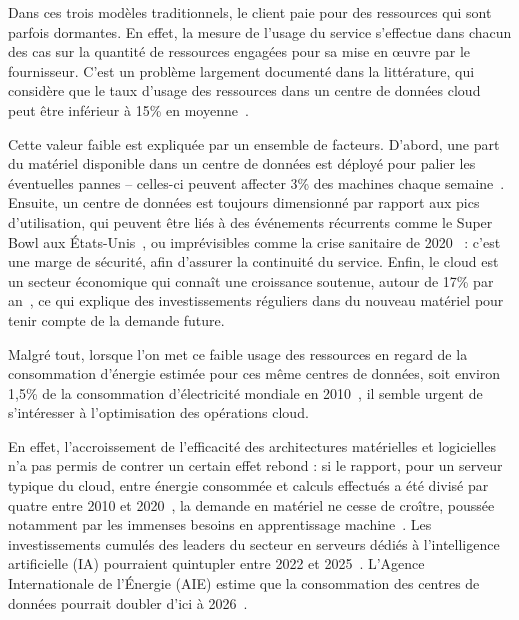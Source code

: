 Dans ces trois modèles traditionnels, le client paie pour des ressources qui sont parfois dormantes. En effet, la mesure de l'usage du service s'effectue dans chacun des cas sur la quantité de ressources engagées pour sa mise en œuvre par le fournisseur. C'est un problème largement documenté dans la littérature, qui considère que le taux d'usage des ressources dans un centre de données cloud peut être inférieur à 15\% en moyenne~\cite{vasanWorthTheirWatts2010, vermaLargescaleClusterManagement2015a}.

Cette valeur faible est expliquée par un ensemble de facteurs. D'abord, une part du matériel disponible dans un centre de données est déployé pour palier les éventuelles pannes -- celles-ci peuvent affecter 3\% des machines chaque semaine~\cite{BareMetal70B}. Ensuite, un centre de données est toujours dimensionné par rapport aux pics d'utilisation, qui peuvent être liés à des événements récurrents comme le Super Bowl aux États-Unis~\cite{wangTouchdownCloudImpact2019}, ou imprévisibles comme la crise sanitaire de 2020~\cite{alashhabImpactCoronavirusPandemic2021} : c'est une marge de sécurité, afin d'assurer la continuité du service. Enfin, le cloud est un secteur économique qui connaît une croissance soutenue, autour de 17\% par an~\cite{}, ce qui explique des investissements réguliers dans du nouveau matériel pour tenir compte de la demande future.

Malgré tout, lorsque l'on met ce faible usage des ressources en regard de la consommation d'énergie estimée pour ces même centres de données, soit environ 1,5\% de la consommation d'électricité mondiale en 2010~\cite{masanetRecalibratingGlobalData2020}, il semble urgent de s'intéresser à l'optimisation des opérations cloud.

En effet, l'accroissement de l'efficacité des architectures matérielles et logicielles n'a pas permis de contrer un certain effet rebond : si le rapport, pour un serveur typique du cloud, entre énergie consommée et calculs effectués a été divisé par quatre entre 2010 et 2020~\cite{masanetRecalibratingGlobalData2020}, la demande en matériel ne cesse de croître, poussée notamment par les immenses besoins en apprentissage machine~\cite{commentMetaOperate6002024}. Les investissements cumulés des leaders du secteur en serveurs dédiés à l'intelligence artificielle (IA) pourraient quintupler entre 2022 et 2025~\cite{DerriereIADeferlante2024, elderNextWaveAI2024}. L'Agence Internationale de l'Énergie (AIE) estime que la consommation des centres de données pourrait doubler d'ici à 2026~\cite{Electricity2024Analysis2024}.

